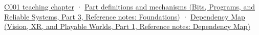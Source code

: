 \hypertarget{appendix-5bee2df85484-source-and-navigation}{}

\hyperref[01-foundations-i-ch001-from-a-signal-to-an-interpretation]{C001 teaching chapter} · \href{../01-Bits-Programs-and-Reliable-Systems-P03/main.pdf\#appendix-fd090d982a15}{Part definitions and mechanisms (Bits, Programs, and Reliable Systems, Part 3, Reference notes: Foundations)} · \href{../07-Vision-XR-and-Playable-Worlds-P01/main.pdf\#appendix-4ad47bdd269a}{Dependency Map (Vision, XR, and Playable Worlds, Part 1, Reference notes: Dependency Map)}
